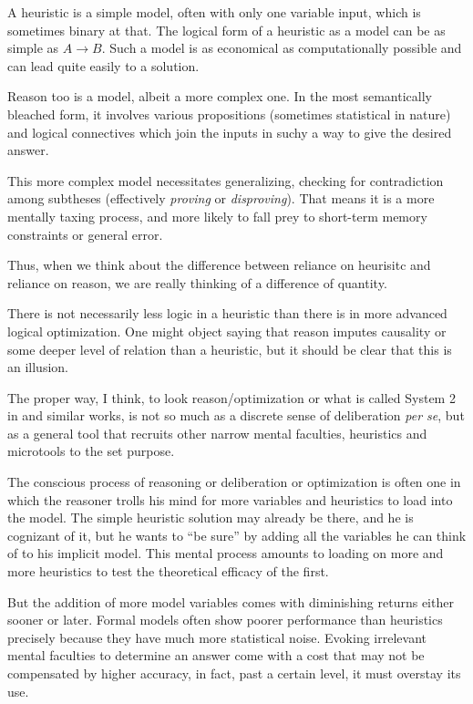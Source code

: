\documentclass{article}
\begin{document}
A heuristic is a simple model, often with only one variable input, which is sometimes binary at that.
The logical form of a heuristic as a model can be as simple as $A{\rightarrow}B$.
Such a model is as economical as computationally possible and can lead quite easily to a solution.

Reason too is a model, albeit a more complex one.
In the most semantically bleached form, it involves various propositions (sometimes statistical in nature) and logical connectives which join the inputs in suchy a way to give the desired answer.

This more complex model necessitates generalizing, checking for contradiction among subtheses (effectively \textit{proving} or \textit{disproving}).
That means it is a more mentally taxing process, and more likely to fall prey to short-term memory constraints or general error.

Thus, when we think about the difference between reliance on heurisitc and reliance on reason, we are really thinking of a difference of quantity.

There is not necessarily less logic in a heuristic than there is in more advanced logical optimization.
One might object saying that reason imputes causality or some deeper level of relation than a heuristic, but it should be clear that this is an illusion.

The proper way, I think, to look reason/optimization or what is called System 2 in \textcite{kahneman11} and similar works, is not so much as a discrete sense of deliberation \emph{per se}, but as a general tool that recruits other narrow mental faculties, heuristics and microtools to the set purpose.

The conscious process of reasoning or deliberation or optimization is often one in which the reasoner trolls his mind for more variables and heuristics to load into the model.
The simple heuristic solution may already be there, and he is cognizant of it, but he wants to ``be sure'' by adding all the variables he can think of to his implicit model.
This mental process amounts to loading on more and more heuristics to test the theoretical efficacy of the first.

But the addition of more model variables comes with diminishing returns either sooner or later.
Formal models often show poorer performance than heuristics precisely because they have much more statistical noise.
Evoking irrelevant mental faculties to determine an answer come with a cost that may not be compensated by higher accuracy, in fact, past a certain level, it must overstay its use.
\end{document}

